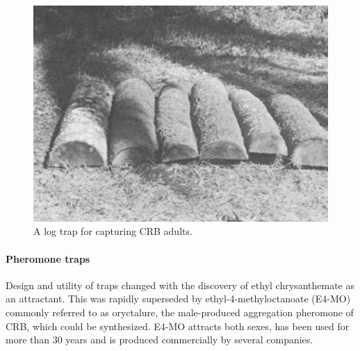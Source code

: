 \documentclass[twocolumn,letterpaper]{scrartcl}
\begin{document}
\begin{figure}[h]
	\centering
	\includegraphics[width=0.7\linewidth]{images/log-tap}
	\caption{A log trap for capturing CRB adults.}
	\label{fig:log-tap}
\end{figure}

\paragraph{Pheromone traps} Design and utility of traps changed with the discovery of ethyl chrysanthemate as an attractant. This was rapidly superseded by ethyl-4-methyloctanoate (E4-MO) commonly referred to as oryctalure, the male-produced aggregation pheromone of CRB, which could be synthesized. E4-MO attracts both sexes, has been used for more than 30 years and is produced commercially by several companies. 
\end{document}
